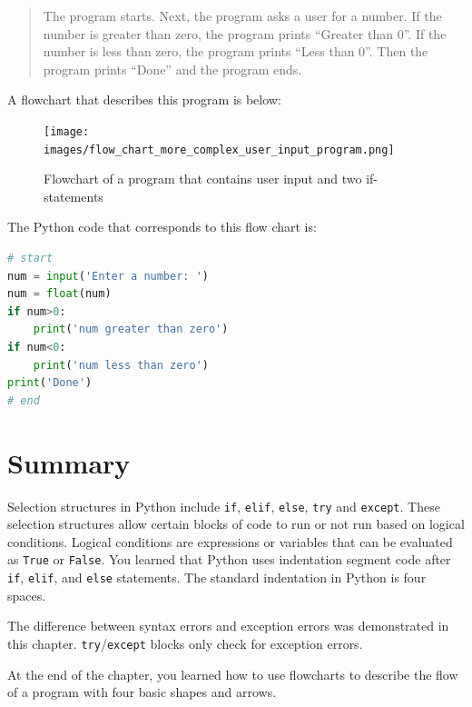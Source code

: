 \documentclass{book}
\begin{document}
\begin{quote}
The program starts. Next, the program asks a user for a number. If the
number is greater than zero, the program prints ``Greater than 0''. If
the number is less than zero, the program prints ``Less than 0''. Then
the program prints ``Done'' and the program ends.
\end{quote}

A flowchart that describes this program is below:

\begin{figure}
\centering
\texttt{[image: images/flow\_chart\_more\_complex\_user\_input\_program.png]}
\caption{Flowchart of a program that contains user input and two
if-statements}
\end{figure}

The Python code that corresponds to this flow chart is:

\begin{lstlisting}[language=Python]
# start
num = input('Enter a number: ')
num = float(num)
if num>0:
    print('num greater than zero')
if num<0:
    print('num less than zero')
print('Done')
# end
\end{lstlisting}
    




    
        \newpage
        \section{Summary}\label{summary}

    




    
        Selection structures in Python include \lstinline!if!, \lstinline!elif!,
\lstinline!else!, \lstinline!try! and \lstinline!except!. These
selection structures allow certain blocks of code to run or not run
based on logical conditions. Logical conditions are expressions or
variables that can be evaluated as \lstinline!True! or
\lstinline!False!. You learned that Python uses indentation segment code
after \lstinline!if!, \lstinline!elif!, and \lstinline!else! statements.
The standard indentation in Python is four spaces.

The difference between syntax errors and exception errors was
demonstrated in this chapter. \lstinline!try!/\lstinline!except! blocks
only check for exception errors.

At the end of the chapter, you learned how to use flowcharts to describe
the flow of a program with four basic shapes and arrows.
    
\end{document}

